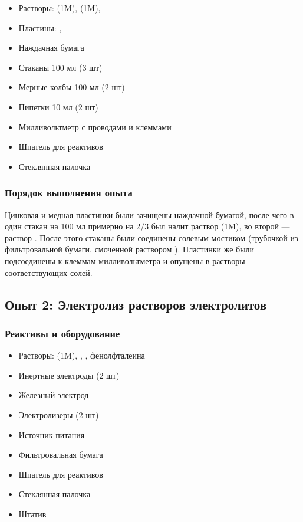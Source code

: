 \documentclass[a4paper, 12pt]{article}
\begin{document}
\begin{itemize}
	\item Растворы:  (1M),  (1M), 
	\item Пластины: , 
	
	\item Наждачная бумага
	\item Стаканы 100 мл (3 шт)
	\item Мерные колбы 100 мл (2 шт)
	\item Пипетки 10 мл (2 шт)
	\item Милливольтметр с проводами и клеммами
	\item Шпатель для реактивов
	\item Стеклянная палочка
\end{itemize}

\subsubsection{Порядок выполнения опыта}

Цинковая и медная пластинки были зачищены наждачной бумагой, после чего в один стакан на 100 мл примерно на 2/3 был  налит раствор  (1M), во второй --- раствор . После этого стаканы были соединены солевым мостиком (трубочкой из фильтровальной бумаги, смоченной раствором ). Пластинки же были подсоединены к клеммам милливольтметра и опущены в растворы соответствующих солей.



\subsection{Опыт 2: Электролиз растворов электролитов}

\subsubsection{Реактивы и оборудование}

\begin{itemize}
	\item Растворы:  (1M), , , фенолфталеина
	
	\item Инертные электроды (2 шт)
	\item Железный электрод
	\item Электролизеры (2 шт)
	\item Источник питания
	\item Фильтровальная бумага
	\item Шпатель для реактивов
	\item Стеклянная палочка
	\item Штатив
\end{itemize}
\end{document}
